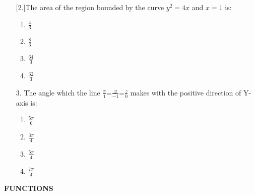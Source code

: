 \documentclass[12pt,-letter paper]{article}
\providecommand{\brak}[1]{\ensuremath{\left(#1\right)}}
\begin{document}
\begin{enumerate}[label=\Alph*.]
                [2.]The area of the region bounded by the curve $y^2=4x$ and $x=1$ is:                                                                          \begin{enumerate}[label={$\brak{\Alph*}$}]                                      \item $\frac{4}{3}$                                                     \item $\frac{8}{3}$                                                     \item $\frac{64}{3}$                                                    \item $\frac{32}{3}$                                            \end{enumerate}                                                 \item                                                                           [3.]The angle which the line $\frac{x}{1}$=$\frac{y}{-1}$=$\frac{z}{0}$ makes with the positive direction of  Y-axis is:                        \begin{enumerate}[label={$\brak{\Alph*}$}]                                      \item $\frac{5\pi}{6}$                                                  \item $\frac{3\pi}{4}$                                                  \item $\frac{5\pi}{4}$                                                  \item $\frac{7\pi}{4}$                                          \end{enumerate}                                                                                                                 \end{enumerate}                                                                      \begin{center}                                             \textbf{FUNCTIONS}                                                      \end{center}
\end{document}
